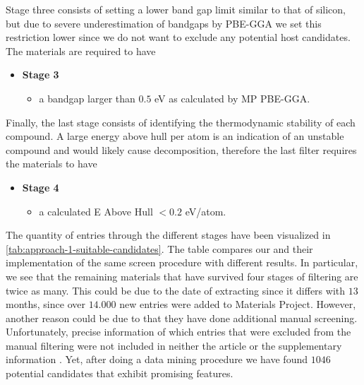 \noindent Stage three consists of setting a lower band gap limit similar to that of silicon, but due to severe underestimation of bandgaps by PBE-GGA we set this restriction lower since we do not want to exclude any potential host candidates. The materials are required to have
\begin{itemize}
  \item[]{\textbf{Stage 3}}
  \begin{itemize}
  \item a bandgap larger than $0.5$ eV as calculated by MP PBE-GGA.
  \end{itemize}
\end{itemize}

\noindent Finally, the last stage consists of identifying the thermodynamic stability of each compound. A large energy above hull per atom is an indication of an unstable compound and would likely cause decomposition, therefore the last filter requires the materials to have

\begin{itemize}
  \item[]{\textbf{Stage 4}}
  \begin{itemize}
  \item a calculated E Above Hull $<0.2$ eV/atom.
  \end{itemize}
\end{itemize}

\noindent The quantity of entries through the different stages have been visualized in \autoref{tab:approach-1-suitable-candidates}. The table compares our and their implementation of the same screen procedure with different results. In particular, we see that the remaining materials that have survived four stages of filtering are twice as many. This could be due to the date of extracting since it differs with $13$ months, since over $14.000$ new entries were added to Materials Project. However, another reason could be due to that they have done additional manual screening. Unfortunately, precise information of which entries that were excluded from the manual filtering were not included in neither the article or the supplementary information \cite{Ferrenti2020}. Yet, after doing a data mining procedure we have found $1046$ potential candidates that exhibit promising features.

